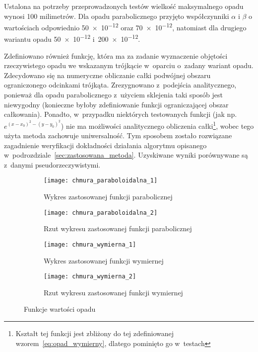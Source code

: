 Ustalona na potrzeby przeprowadzonych testów wielkość maksymalnego opadu wynosi 100 milimetrów. Dla opadu parabolicznego przyjęto współczynniki $\alpha$ i $\beta$ o wartościach odpowiednio \num{50e-12} oraz \num{70e-12}, natomiast dla drugiego wariantu opadu \num{50e-12} i~\num{200e-12}. 


Zdefiniowano również funkcję, która ma za zadanie wyznaczenie objętości rzeczywistego opadu we wskazanym trójkącie w~oparciu o~zadany wariant opadu. Zdecydowano się na numeryczne obliczanie całki podwójnej obszaru ograniczonego odcinkami trójkąta. Zrezygnowano z~podejścia analitycznego, ponieważ dla opadu parabolicznego z~użyciem sklejenia taki sposób jest niewygodny (konieczne byłoby zdefiniowanie funkcji ograniczającej obszar całkowania). Ponadto, w~przypadku niektórych testowanych funkcji (jak np. $e^{(x-x_0)^2 - (y-y_0)^2}$) nie ma możliwości analitycznego obliczenia całki\footnote{Kształt tej funkcji jest zbliżony do tej zdefiniowanej wzorem~\ref{eq:opad_wymierny}, dlatego pominięto go w~testach}, wobec tego użyta metoda zachowuje uniwersalność. Tym sposobem zostało rozwiązane zagadnienie weryfikacji dokładności działania algorytmu opisanego w~podrozdziale~\ref{sec:zastosowana_metoda}. Uzyskiwane wyniki porównywane są z~danymi pseudorzeczywistymi.

\begin{figure}[ht]
\centering
	\begin{subfigure}{.5\textwidth}
		\centering
		\texttt{[image: chmura\_paraboloidalna\_1]}
		\caption{Wykres zastosowanej funkcji parabolicznej}
		\label{fig:elipsa_3d}
	\end{subfigure}%
	\begin{subfigure}{0.5\textwidth}
		\centering
		\texttt{[image: chmura\_paraboloidalna\_2]}
		\caption{Rzut wykresu zastosowanej funkcji parabolicznej}
		\label{fig:elipsa_2d}
	\end{subfigure}	
	
	\begin{subfigure}{.5\textwidth}
		\centering
		\texttt{[image: chmura\_wymierna\_1]}
		\caption{Wykres zastosowanej funkcji wymiernej}
		\label{fig:elipsa_3d}
	\end{subfigure}%
	\begin{subfigure}{0.5\textwidth}
		\centering
		\texttt{[image: chmura\_wymierna\_2]}
		\caption{Rzut wykresu zastosowanej funkcji wymiernej}
		\label{fig:elipsa_2d}
	\end{subfigure}	
\caption{Funkcje wartości opadu}
\end{figure}

